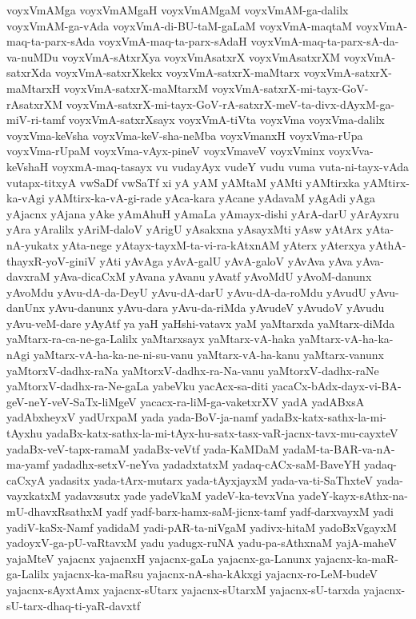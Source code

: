 {voyxVmAMga
voyxVmAMgaH
voyxVmAMgaM
voyxVmAM-ga-dalilx
voyxVmAM-ga-vAda
voyxVmA-di-BU-taM-gaLaM
voyxVmA-maqtaM
voyxVmA-maq-ta-parx-sAda
voyxVmA-maq-ta-parx-sAdaH
voyxVmA-maq-ta-parx-sA-da-va-nuMDu
voyxVmA-sAtxrXya
voyxVmAsatxrX
voyxVmAsatxrXM
voyxVmA-satxrXda
voyxVmA-satxrXkekx
voyxVmA-satxrX-maMtarx
voyxVmA-satxrX-maMtarxH
voyxVmA-satxrX-maMtarxM
voyxVmA-satxrX-mi-tayx-GoV-rAsatxrXM
voyxVmA-satxrX-mi-tayx-GoV-rA-satxrX-meV-ta-divx-dAyxM-ga-miV-ri-tamf
voyxVmA-satxrXsayx
voyxVmA-tiVta
voyxVma
voyxVma-dalilx
voyxVma-keVsha
voyxVma-keV-sha-neMba
voyxVmanxH
voyxVma-rUpa
voyxVma-rUpaM
voyxVma-vAyx-pineV
voyxVmaveV
voyxVminx
voyxVva-keVshaH
voyxmA-maq-tasayx
vu
vudayAyx
vudeY
vudu
vuma
vuta-ni-tayx-vAda
vutapx-titxyA
vwSaDf
vwSaTf
xi
yA
yAM
yAMtaM
yAMti
yAMtirxka
yAMtirx-ka-vAgi
yAMtirx-ka-vA-gi-rade
yAca-kara
yAcane
yAdavaM
yAgAdi
yAga
yAjacnx
yAjana
yAke
yAmAhuH
yAmaLa
yAmayx-dishi
yArA-darU
yArAyxru
yAra
yAralilx
yAriM-daloV
yArigU
yAsakxna
yAsayxMti
yAsw
yAtArx
yAta-nA-yukatx
yAta-nege
yAtayx-tayxM-ta-vi-ra-kAtxnAM
yAterx
yAterxya
yAthA-thayxR-yoV-giniV
yAti
yAvAga
yAvA-galU
yAvA-galoV
yAvAva
yAva
yAva-davxraM
yAva-dicaCxM
yAvana
yAvanu
yAvatf
yAvoMdU
yAvoM-danunx
yAvoMdu
yAvu-dA-da-DeyU
yAvu-dA-darU
yAvu-dA-da-roMdu
yAvudU
yAvu-danUnx
yAvu-danunx
yAvu-dara
yAvu-da-riMda
yAvudeV
yAvudoV
yAvudu
yAvu-veM-dare
yAyAtf
ya
yaH
yaHshi-vatavx
yaM
yaMtarxda
yaMtarx-diMda
yaMtarx-ra-ca-ne-ga-Lalilx
yaMtarxsayx
yaMtarx-vA-haka
yaMtarx-vA-ha-ka-nAgi
yaMtarx-vA-ha-ka-ne-ni-su-vanu
yaMtarx-vA-ha-kanu
yaMtarx-vanunx
yaMtorxV-dadhx-raNa
yaMtorxV-dadhx-ra-Na-vanu
yaMtorxV-dadhx-raNe
yaMtorxV-dadhx-ra-Ne-gaLa
yabeVku
yacAcx-sa-diti
yacaCx-bAdx-dayx-vi-BA-geV-neY-veV-SaTx-liMgeV
yacacx-ra-liM-ga-vaketxrXV
yadA
yadABxsA
yadAbxheyxV
yadUrxpaM
yada
yada-BoV-ja-namf
yadaBx-katx-sathx-la-mi-tAyxhu
yadaBx-katx-sathx-la-mi-tAyx-hu-satx-tasx-vaR-jacnx-tavx-mu-cayxteV
yadaBx-veV-tapx-ramaM
yadaBx-veVtf
yada-KaMDaM
yadaM-ta-BAR-va-nA-ma-yamf
yadadhx-setxV-neYva
yadadxtatxM
yadaq-cACx-saM-BaveYH
yadaq-caCxyA
yadasitx
yada-tArx-mutarx
yada-tAyxjayxM
yada-va-ti-SaThxteV
yada-vayxkatxM
yadavxsutx
yade
yadeVkaM
yadeV-ka-tevxVna
yadeY-kayx-sAthx-na-mU-dhavxRsathxM
yadf
yadf-barx-hamx-saM-jicnx-tamf
yadf-darxvayxM
yadi
yadiV-kaSx-Namf
yadidaM
yadi-pAR-ta-niVgaM
yadivx-hitaM
yadoBxVgayxM
yadoyxV-ga-pU-vaRtavxM
yadu
yadugx-ruNA
yadu-pa-sAthxnaM
yajA-maheV
yajaMteV
yajacnx
yajacnxH
yajacnx-gaLa
yajacnx-ga-Lanunx
yajacnx-ka-maR-ga-Lalilx
yajacnx-ka-maRsu
yajacnx-nA-sha-kAkxgi
yajacnx-ro-LeM-budeV
yajacnx-sAyxtAmx
yajacnx-sUtarx
yajacnx-sUtarxM
yajacnx-sU-tarxda
yajacnx-sU-tarx-dhaq-ti-yaR-davxtf
}
